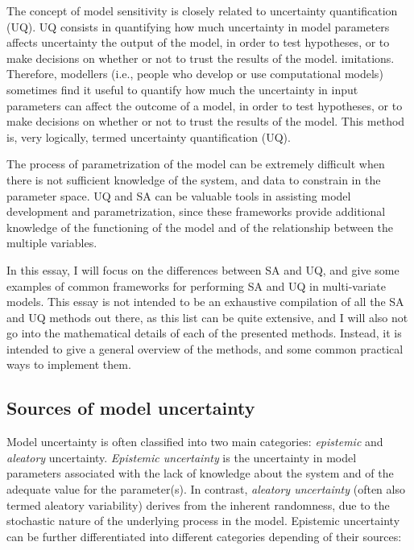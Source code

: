 \documentclass[12pt]{article}
\begin{document}
 The concept of model sensitivity is closely related to uncertainty quantification (UQ). UQ consists in quantifying how much uncertainty in model parameters affects uncertainty the output of the model, in order to test hypotheses, or to make decisions on whether or not to trust the results of the model. 
imitations. Therefore, modellers (i.e., people who develop or use computational models)  sometimes find it useful to quantify how much the uncertainty in input parameters can affect the outcome of a model, in order to test hypotheses, or to make decisions on whether or not to trust the results of the model. This method is, very logically, termed uncertainty quantification (UQ).

 The process of parametrization of the model can be extremely difficult when there is not sufficient knowledge of the system, and data to constrain in the parameter space. UQ and SA can be valuable tools in assisting model development and parametrization, since these frameworks provide additional knowledge of the functioning of the model and of the relationship between the multiple variables.
 
  \vspace{0.5cm}
 In this essay, I will focus on the differences between SA and UQ, and give some examples of common frameworks for performing SA and UQ in multi-variate models. This essay is not intended to be an exhaustive compilation of all the SA and UQ methods out there, as this list can be quite extensive, and I will also not go into the mathematical details of each of the presented methods. Instead, it is intended to give a general overview of the methods, and some common practical ways to implement them.
 

 \subsection{Sources of model uncertainty}
 
 
 Model uncertainty is often classified into two main categories: \textit{epistemic} and \textit{aleatory} uncertainty. \textit{Epistemic uncertainty} is the uncertainty in model parameters associated with the lack of knowledge about the system and of the adequate value for the parameter(s). In contrast, \textit{aleatory uncertainty} (often also termed aleatory variability) derives from the inherent randomness, due to the stochastic nature of the underlying process in the model.  
 Epistemic uncertainty can be further differentiated into different categories depending of their sources:
 
\end{document}
